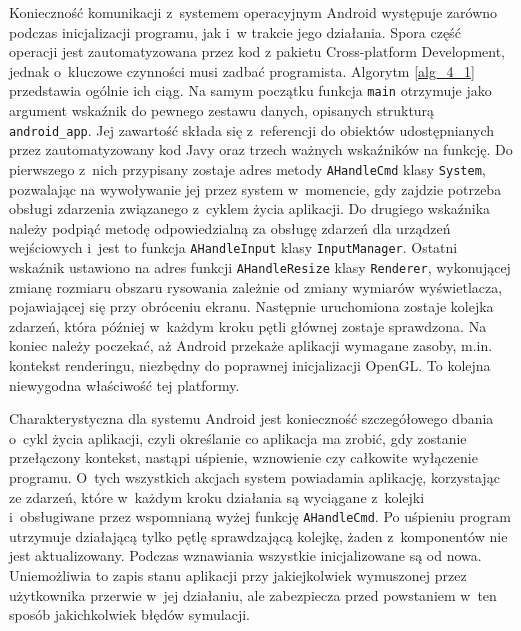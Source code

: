 		Konieczność komunikacji z~systemem operacyjnym Android występuje zarówno podczas inicjalizacji programu, jak i~w trakcie jego działania. Spora część operacji jest zautomatyzowana przez kod z pakietu Cross-platform Development, jednak o~kluczowe czynności musi zadbać programista. Algorytm \ref{alg_4_1} przedstawia ogólnie ich ciąg. Na samym początku funkcja \texttt{main} otrzymuje jako argument wskaźnik do pewnego zestawu danych, opisanych strukturą \texttt{android\_app}. Jej zawartość składa się z~referencji do obiektów udostępnianych przez zautomatyzowany kod Javy oraz trzech ważnych wskaźników na funkcję. Do pierwszego z~nich przypisany zostaje adres metody \texttt{AHandleCmd} klasy \texttt{System}, pozwalając na wywoływanie jej przez system w~momencie, gdy zajdzie potrzeba obsługi zdarzenia związanego z~cyklem życia aplikacji. Do drugiego wskaźnika należy podpiąć metodę odpowiedzialną za obsługę zdarzeń dla urządzeń wejściowych i~jest to funkcja \texttt{AHandleInput} klasy \texttt{InputManager}. Ostatni wskaźnik ustawiono na adres funkcji \texttt{AHandleResize} klasy \texttt{Renderer}, wykonującej zmianę rozmiaru obszaru rysowania zależnie od zmiany wymiarów wyświetlacza, pojawiającej się przy obróceniu ekranu. Następnie uruchomiona zostaje kolejka zdarzeń, która później w~każdym kroku pętli głównej zostaje sprawdzona. Na koniec należy poczekać, aż Android przekaże aplikacji wymagane zasoby, m.in. kontekst renderingu, niezbędny do poprawnej inicjalizacji OpenGL. To kolejna niewygodna właściwość tej platformy.
		
		Charakterystyczna dla systemu Android jest konieczność szczegółowego dbania o~cykl życia aplikacji, czyli określanie co aplikacja ma zrobić, gdy zostanie przełączony kontekst, nastąpi uśpienie, wznowienie czy całkowite wyłączenie programu. O~tych wszystkich akcjach system powiadamia aplikację, korzystając ze zdarzeń, które w~każdym kroku działania są wyciągane z~kolejki i~obsługiwane przez wspomnianą wyżej funkcję \texttt{AHandleCmd}. Po uśpieniu program utrzymuje działającą tylko pętlę sprawdzającą kolejkę, żaden z~komponentów nie jest aktualizowany. Podczas wznawiania wszystkie inicjalizowane są od nowa. Uniemożliwia to zapis stanu aplikacji przy jakiejkolwiek wymuszonej przez użytkownika przerwie w~jej działaniu, ale zabezpiecza przed powstaniem w~ten sposób jakichkolwiek błędów symulacji.
		
